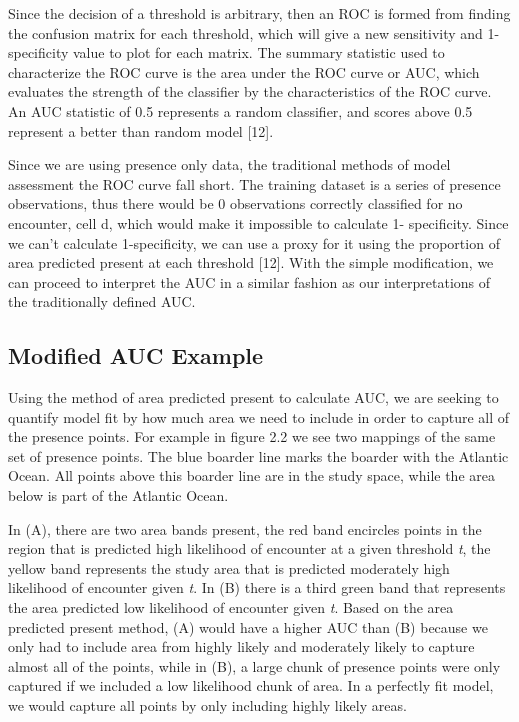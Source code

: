 \noindent Since the decision of a threshold is arbitrary, then an ROC is formed from finding the confusion matrix for each threshold, which will give a new sensitivity and 1-specificity value to plot for each matrix. The summary statistic used to characterize the ROC curve is the area under the ROC curve or AUC, which evaluates the strength of the classifier by the characteristics of the ROC curve. An AUC statistic of 0.5 represents a random classifier, and scores above 0.5 represent a better than random model [12].    \newline

\noindent Since we are using presence only data, the traditional methods of model assessment the ROC curve fall short. The training dataset is a series of presence observations, thus there would be 0 observations correctly classified for no encounter, cell d,  which would make it impossible to calculate 1- specificity. Since we can't calculate 1-specificity, we can use a proxy for it using the proportion of area predicted present at each threshold [12]. With the simple modification, we can proceed to interpret the AUC in a similar fashion as our interpretations of the traditionally defined AUC. \newline

\subsection{Modified AUC Example }

Using the method of area predicted present to calculate AUC, we are seeking to quantify model fit by how much area we need to include in order to capture all of the presence points. For example in figure 2.2 we see two mappings of the same set of presence points. The blue boarder line marks the boarder with the Atlantic Ocean. All points above this boarder line are in the study space, while the area below is part of the Atlantic Ocean. \newline

\noindent In (A), there are two area bands present, the red band encircles points in the region that is predicted high likelihood of encounter at a given threshold \textit{t}, the yellow band represents the study area that is predicted moderately high likelihood of encounter given \textit{t}. In (B) there is a third green band that represents the area predicted low likelihood of encounter given \textit{t}. Based on the area predicted present method, (A) would have a higher AUC than (B) because we only had to include area from highly likely and moderately likely to capture almost all of the points, while in (B), a large chunk of presence points were only captured if we included a low likelihood chunk  of area. In a perfectly fit model, we would capture all points by only including highly likely areas. \newline

